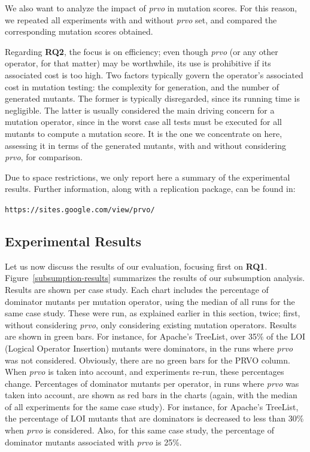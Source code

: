 We also want to analyze the impact of \emph{prvo} in mutation scores. For this reason, we repeated all experiments with and without \emph{prvo} set, and compared the corresponding mutation scores obtained.

Regarding \textbf{RQ2}, the focus is on efficiency; even though \emph{prvo} (or any other operator, for that matter) may be worthwhile, its use is prohibitive if its associated cost is too high. Two factors typically govern the operator's associated cost in mutation testing: the complexity for generation, and the number of generated mutants. The former is typically disregarded, since its running time is negligible. The latter is usually considered the main driving concern for a mutation operator, since in the worst case all tests must be executed for all mutants to compute a mutation score. It is the one we concentrate on here, assessing it in terms of the generated mutants, with and without considering \emph{prvo}, for comparison. 

Due to space restrictions, we only report here a summary of the experimental results. Further information, along with a replication package, can be found in:
\begin{center}
	\texttt{https://sites.google.com/view/prvo/}
\end{center}


\subsection{Experimental Results}

Let us now discuss the results of our evaluation, focusing first on \textbf{RQ1}. Figure~\ref{subsumption-results} summarizes the results of our subsumption analysis. Results are shown per case study. Each chart includes the percentage of dominator mutants per mutation operator, using the median of all runs for the same case study. These were run, as explained earlier in this section, twice; first, without considering \emph{prvo}, only considering existing mutation operators. Results are shown in green bars. For instance, for Apache's TreeList, over 35\% of the LOI (Logical Operator Insertion) mutants were dominators, in the runs where \emph{prvo} was not considered. Obviously, there are no green bars for the PRVO column. When \emph{prvo} is taken into account, and experiments re-run, these percentages change. Percentages of dominator mutants per operator, in runs where \emph{prvo} was taken into account, are shown as red bars in the charts (again, with the median of all experiments for the same case study). For instance, for Apache's TreeList, the percentage of LOI mutants that are dominators is decreased to less than 30\% when \emph{prvo} is considered. Also, for this same case study, the percentage of dominator mutants associated with \emph{prvo} is 25\%. 

